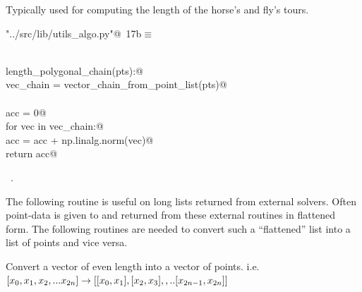\documentclass[11.5pt]{report}
\begin{document}
Typically used for computing the length of the horse's and fly's tours. 

\begin{flushleft} \small\label{scrap13}\raggedright\small
{} \verb@"../src/lib/utils_algo.py"@\nobreak\ {\footnotesize {17b}}$\equiv$
\vspace{-1ex}
\begin{list}{}{} \item
\mbox{}\verb@@\\
\mbox{}\verb@def length_polygonal_chain(pts):@\\
\mbox{}\verb@    vec_chain = vector_chain_from_point_list(pts)@\\
\mbox{}\verb@@\\
\mbox{}\verb@    acc = 0@\\
\mbox{}\verb@    for vec in vec_chain:@\\
\mbox{}\verb@        acc = acc + np.linalg.norm(vec)@\\
\mbox{}\verb@    return acc@\\
\mbox{}\verb@@{\NWsep}
\end{list}
\vspace{-1.5ex}
\footnotesize
\begin{list}{}{\setlength{\itemsep}{-\parsep}\setlength{\itemindent}{-\leftmargin}}
\item \NWtxtFileDefBy\ .

\item{}
\end{list}
\vspace{4ex}
\end{flushleft}
\newchunk The following routine is useful on long lists returned from external solvers. 
Often point-data is given to and returned from these external routines in flattened
form. The following routines are needed to convert such a ``flattened'' list into 
a list of points and vice versa. 

Convert a vector of even length into a vector of points. i.e. 
$[x_0,x_1,x_2,...x_{2n}] \rightarrow [[x_0,x_1],[x_2,x_3],,..[x_{2n-1},x_{2n}]]$
\end{document}
